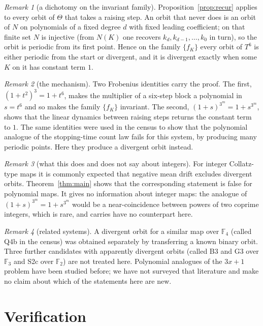\documentclass[11pt,a4paper]{article}
\theoremstyle{remark}
\newtheorem{remark}{Remark}
\newcommand{\F}{\mathbb F}
\begin{document}
\begin{remark}[a dichotomy on the invariant family]
Proposition~\ref{prop:recur} applies to every orbit of $\Theta$ that takes a raising step. An orbit
that never does is an orbit of $N$ on polynomials of a fixed degree $d$ with fixed leading
coefficient; on that finite set $N$ is injective (from $N(K)$ one recovers $k_d,k_{d-1},\dots,k_0$
in turn), so the orbit is periodic from its first point. Hence on the family $\{f_K\}$ every
orbit of $T^6$ is either periodic from the start or divergent, and it is divergent exactly when
some $K$ on it has constant term $1$.
\end{remark}

\begin{remark}[the mechanism]
Two Frobenius identities carry the proof. The first, $(1+t^2)^3=1+t^6$, makes the multiplier of a
six-step block a polynomial in $s=t^6$ and so makes the family $\{f_K\}$ invariant. The second,
$(1+s)^{3^m}=1+s^{3^m}$, shows that the linear dynamics between raising steps returns the constant
term to $1$. The same identities were used in the census to show that the polynomial analogue of
the stopping-time count law fails for this system, by producing many periodic points. Here they
produce a divergent orbit instead.
\end{remark}

\begin{remark}[what this does and does not say about integers]
For integer Collatz-type maps it is commonly expected that negative mean drift excludes divergent
orbits. Theorem~\ref{thm:main} shows that the corresponding statement is false for polynomial
maps. It gives no information about integer maps: the analogue of $(1+s)^{3^m}=1+s^{3^m}$ would be
a near-coincidence between powers of two coprime integers, which is rare, and carries have no
counterpart here.
\end{remark}

\begin{remark}[related systems]
A divergent orbit for a similar map over $\F_4$ (called Q4b in the census) was obtained separately
by transferring a known binary orbit. Three further candidates with apparently divergent orbits
(called B3 and G3 over $\F_3$ and S2c over $\F_2$) are not treated here. Polynomial analogues of the
$3x+1$ problem have been studied before; we have not surveyed that literature and make no claim
about which of the statements here are new.
\end{remark}

\section{Verification}
\sloppy
\end{document}

